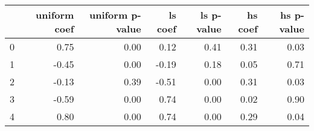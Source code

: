 \begin{tabular}{lrrrrrr}
\toprule
 & uniform coef & uniform p-value & ls coef & ls p-value & hs coef & hs p-value \\
\midrule
0 & 0.75 & 0.00 & 0.12 & 0.41 & 0.31 & 0.03 \\
1 & -0.45 & 0.00 & -0.19 & 0.18 & 0.05 & 0.71 \\
2 & -0.13 & 0.39 & -0.51 & 0.00 & 0.31 & 0.03 \\
3 & -0.59 & 0.00 & 0.74 & 0.00 & 0.02 & 0.90 \\
4 & 0.80 & 0.00 & 0.74 & 0.00 & 0.29 & 0.04 \\
\bottomrule
\end{tabular}
